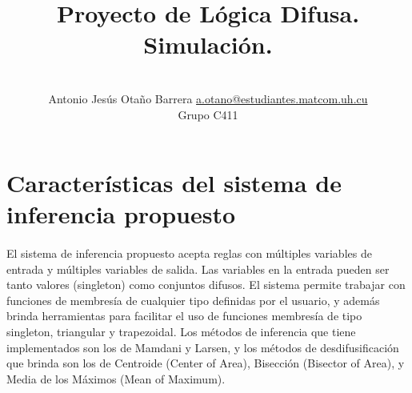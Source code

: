 \documentclass[a4paper,10pt,twocolumn]{article}
\title{Proyecto de Lógica Difusa. Simulación.}
\author{\\
\name Antonio Jesús Otaño Barrera \email \href{mailto:a.otano@estudiantes.matcom.uh.cu}{a.otano@estudiantes.matcom.uh.cu}
	\\ \addr Grupo C411}
\begin{document}




\section{Características del sistema de inferencia propuesto}\label{sec:1}

  \paragraph{} El sistema de inferencia propuesto acepta reglas con  múltiples variables de entrada y múltiples variables de salida. Las variables
  en la entrada pueden ser tanto valores (singleton) como conjuntos difusos. El sistema permite trabajar con funciones de membresía
  de cualquier tipo definidas por el usuario, y además brinda herramientas para facilitar el uso de funciones membresía de tipo singleton, triangular
  y trapezoidal. Los métodos de inferencia que tiene implementados son los de Mamdani y Larsen, y los métodos de desdifusificación que
  brinda son los de Centroide (Center of Area), Bisección (Bisector of Area), y Media de los Máximos (Mean of Maximum).
\end{document}
